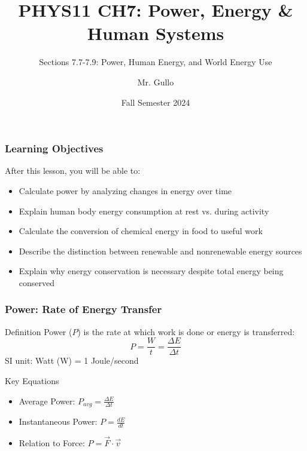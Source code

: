 \documentclass{beamer}
\title[Power \& Energy Systems]{PHYS11 CH7: Power, Energy \& Human Systems}
\subtitle{Sections 7.7-7.9: Power, Human Energy, and World Energy Use}
\author[Mr. Gullo]{Mr. Gullo}
\date[Fall 2024]{Fall Semester 2024}
\begin{document}
\frame{\titlepage}

\begin{frame}
\frametitle{Learning Objectives}
\begin{block}{After this lesson, you will be able to:}
\begin{itemize}
\item Calculate power by analyzing changes in energy over time
\item Explain human body energy consumption at rest vs. during activity
\item Calculate the conversion of chemical energy in food to useful work
\item Describe the distinction between renewable and nonrenewable energy sources
\item Explain why energy conservation is necessary despite total energy being conserved
\end{itemize}
\end{block}
\end{frame}

\begin{frame}
\frametitle{Power: Rate of Energy Transfer}
\begin{block}{Definition}
Power ($P$) is the rate at which work is done or energy is transferred:
\[ P = \frac{W}{t} = \frac{\Delta E}{\Delta t} \]
SI unit: Watt (W) = 1 Joule/second
\end{block}
\begin{block}{Key Equations}
\begin{itemize}
\item Average Power: $P_{avg} = \frac{\Delta E}{\Delta t}$
\item Instantaneous Power: $P = \frac{dE}{dt}$
\item Relation to Force: $P = \vec{F} \cdot \vec{v}$
\end{itemize}
\end{block}
\end{frame}
\end{document}
